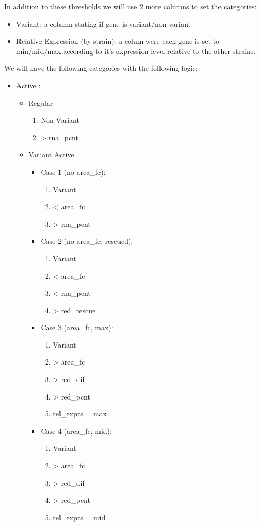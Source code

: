\documentclass[11pt]{article}
\begin{document}
In addition to these thresholds we will use 2 more columns to set the categories:
\begin{itemize}
\item Variant: a column stating if gene is variant/non-variant
\item Relative Expression (by strain): a colum were each gene is set to min/mid/max according to it's expression level relative to the other strains.
\end{itemize}

We will have the following categories with the following logic:

\begin{itemize}
\item Active :

\begin{itemize}
\item Regular
\begin{enumerate}
\item Non-Variant
\item > rna\_pcnt
\end{enumerate}

\item Variant Active
\begin{itemize}
\item Case 1 (no area\_fc):
\begin{enumerate}
\item Variant
\item < area\_fc
\item > rna\_pcnt
\end{enumerate}
\item Case 2 (no area\_fc, rescued):
\begin{enumerate}
\item Variant
\item < area\_fc
\item < rna\_pcnt
\item > red\_rescue
\end{enumerate}
\item Case 3 (area\_fc, max):
\begin{enumerate}
\item Variant
\item > area\_fc
\item > red\_dif
\item > red\_pcnt
\item rel\_exprs = max
\end{enumerate}
\item Case 4 (area\_fc, mid):
\begin{enumerate}
\item Variant
\item > area\_fc
\item > red\_dif
\item > red\_pcnt
\item rel\_exprs = mid
\end{enumerate}
\end{itemize}


\end{itemize}
\end{itemize}
\end{document}
